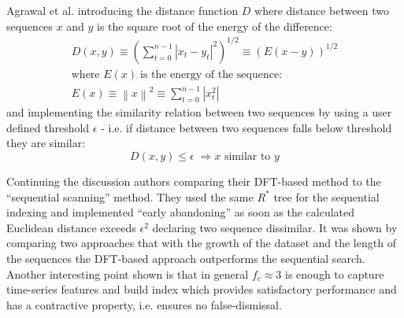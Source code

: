 Agrawal et al. introducing the distance function $D$ where distance between two sequences $x$ and $y$ is the square root of the energy of the difference:
\begin{align}
D(x,y) \equiv \left( \sum_{t=0}^{n-1} \left| x_{t} - y_{t} \right| ^{2} \right) ^{1/2}
       \equiv \left( E(x-y) \right) ^{1/2} \\
\text{where } E(x) \; \text{is the energy of the sequence:} \nonumber \\
E(x) \equiv \left\| x \right\| ^{2} \equiv \sum_{t=0}^{n-1} \left| x_{t} ^{2} \right|
\label{eq:dft_distance}
\end{align}
and implementing the similarity relation between two sequences by using a user defined threshold $\epsilon$ - i.e. if distance between two sequences falls below threshold they are similar:
\begin{equation}
D(x,y) \leq \epsilon \; \Rightarrow \text{$x$ similar to $y$}
\label{eq:dft_similarity_dft}
\end{equation}

Continuing the discussion authors comparing their DFT-based method to the ``sequential scanning'' method. They used the same $R^{*}$ tree for the sequential indexing and implemented ``early abandoning'' as soon as the calculated Euclidean distance exceeds $\epsilon^{2}$ declaring two sequence dissimilar. It was shown by comparing two approaches that with the growth of the dataset and the length of the sequences the DFT-based approach outperforms the sequential search. Another interesting point shown is that in general $f_{c} \approx 3$ is enough to capture time-series features and build index which provides satisfactory performance and has a contractive property, i.e. ensures no false-dismissal.
